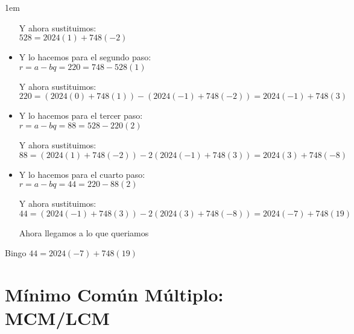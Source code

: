 \documentclass[12pt, fleqn]{report}                             %
\newenvironment{SmallIndentation}[1][0.75em]                    %
    {\begin{adjustwidth}{#1}{}\begin{footnotesize}}                 %
    {\end{footnotesize}\end{adjustwidth}}                           %
\begin{document}
\begin{SmallIndentation}[1em]
\begin{itemize}
                        Y ahora sustituimos:\\
                        $528 = 2024(1) + 748(-2)$


                    \item
                        Y lo hacemos para el segundo paso:\\
                        $r = a - bq = 220 = 748 - 528(1)$

                        Y ahora sustituimos:\\
                        $220 = (2024(0) + 748(1)) - (2024(-1) + 748(-2)) = 2024(-1) + 748(3)$                    

                    \item
                        Y lo hacemos para el tercer paso:\\
                        $r = a - bq = 88 = 528 - 220(2)$

                        Y ahora sustituimos:\\
                        $88 = (2024(1) + 748(-2)) - 2(2024(-1) + 748(3)) = 2024(3) + 748(-8)$    

                    \item
                        Y lo hacemos para el cuarto paso:\\
                        $r = a - bq = 44 = 220 - 88(2)$

                        Y ahora sustituimos:\\
                        $44 = (2024(-1) + 748(3)) - 2(2024(3) + 748(-8)) = 2024(-7) + 748(19)$   

                        Ahora llegamos a lo que queriamos 

                \end{itemize}

                Bingo $44 = 2024(-7) + 748(19)$ 

            \end{SmallIndentation}


            

    \clearpage
    \section{Mínimo Común Múltiplo: MCM/LCM}

\end{document}
